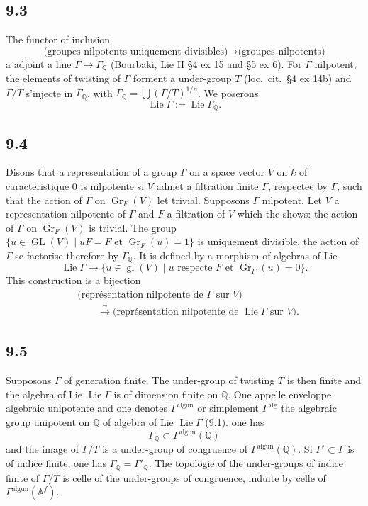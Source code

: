 \documentclass[12pt,a4paper]{article}
\theoremstyle{plain}
\theoremstyle{definition}
\theoremstyle{remark}
\DeclareMathOperator{\Lie}{Lie}
\DeclareMathOperator{\Gr}{Gr}
\DeclareMathOperator{\GL}{GL}
\DeclareMathOperator{\gl}{gl}
\newcommand{\Q}{\mathbb{Q}}
\newcommand{\Af}{\mathbb{A}^f}
\newcommand{\alg}{\mathrm{alg}}
\newcommand{\un}{\mathrm{un}}
\begin{document}
\subsection*{9.3}

The functor of inclusion
$$\text{(groupes nilpotents uniquement divisibles)} \longrightarrow \text{(groupes nilpotents)}$$
a adjoint a line $\Gamma \mapsto \Gamma_\Q$ (Bourbaki, Lie II \S 4 ex 15 and \S 5 ex 6). For $\Gamma$ nilpotent, the elements of twisting of $\Gamma$ forment a under-group $T$ (loc.~cit.~\S 4 ex 14b) and $\Gamma/T$ s'injecte in $\Gamma_\Q$, with $\Gamma_\Q = \bigcup (\Gamma/T)^{1/n}$. We poserons
$$\Lie \Gamma := \Lie \Gamma_\Q.$$

\subsection*{9.4}

Disons that a representation of a group $\Gamma$ on a space vector $V$ on $k$ of caracteristique 0 is nilpotente si $V$ admet a filtration finite $F$, respectee by $\Gamma$, such that the action of $\Gamma$ on $\Gr_F(V)$ let trivial. Supposons $\Gamma$ nilpotent. Let $V$ a representation nilpotente of $\Gamma$ and $F$ a filtration of $V$ which the shows: the action of $\Gamma$ on $\Gr_F(V)$ is trivial. The group $\{u \in \GL(V) \mid uF = F \text{ et } \Gr_F(u) = 1\}$ is uniquement divisible. the action of $\Gamma$ se factorise therefore by $\Gamma_\Q$. It is defined by a morphism of algebras of Lie
$$\Lie \Gamma \longrightarrow \{u \in \gl(V) \mid u \text{ respecte } F \text{ et } \Gr_F(u) = 0\}.$$
This construction is a bijection
\begin{align*}
&\text{(repr\'esentation nilpotente de $\Gamma$ sur $V$)} \\
&\qquad \xrightarrow{\sim} \text{(repr\'esentation nilpotente de $\Lie \Gamma$ sur $V$)}.
\end{align*}

\subsection*{9.5}

Supposons $\Gamma$ of generation finite. The under-group of twisting $T$ is then finite and the algebra of Lie $\Lie \Gamma$ is of dimension finite on $\Q$. One appelle enveloppe algebraic unipotente and one denotes $\Gamma^{\alg \un}$ or simplement $\Gamma^{\alg}$ the algebraic group unipotent on $\Q$ of algebra of Lie $\Lie \Gamma$ (9.1). one has
\begin{equation}\label{9.5.1}
\Gamma_\Q \subset \Gamma^{\alg \un}(\Q) \tag{9.5.1}
\end{equation}
and the image of $\Gamma/T$ is a under-group of congruence of $\Gamma^{\alg \un}(\Q)$. Si $\Gamma' \subset \Gamma$ is of indice finite, one has $\Gamma_\Q = \Gamma'_\Q$. The topologie of the under-groups of indice finite of $\Gamma/T$ is celle of the under-groups of congruence, induite by celle of $\Gamma^{\alg \un}(\Af)$.
\end{document}
